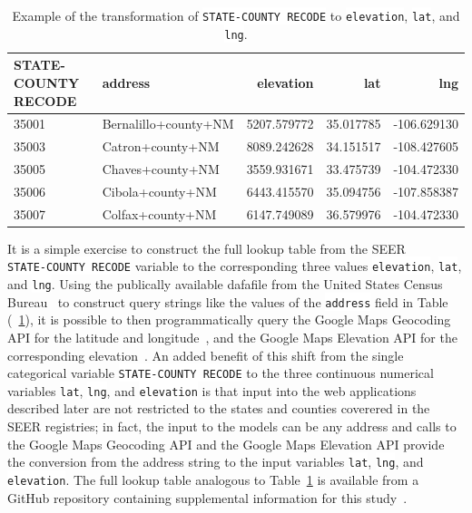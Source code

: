 \documentclass[a4paper,11pt]{article}
\newcommand{\codewhite}[1]{\colorbox{white}{\texttt{#1}}}
\begin{document}
\begin{table}[tbp]
\begin{center}
\begin{tabular}{llrrr}
\toprule
 STATE-COUNTY RECODE &               address &    elevation &        lat &         lng \\
\midrule
35001 &  Bernalillo+county+NM &  5207.579772 &  35.017785 & -106.629130 \\
35003 &      Catron+county+NM &  8089.242628 &  34.151517 & -108.427605 \\
35005 &      Chaves+county+NM &  3559.931671 &  33.475739 & -104.472330 \\
35006 &      Cibola+county+NM &  6443.415570 &  35.094756 & -107.858387 \\
35007 &      Colfax+county+NM &  6147.749089 &  36.579976 & -104.472330 \\
\bottomrule
\end{tabular}
\caption{\label{tab:nmhead} Example of the transformation of \codewhite{STATE-COUNTY RECODE} to \codewhite{elevation}, \codewhite{lat}, and \codewhite{lng}.}
\end{center}
\end{table}

It is a simple exercise to construct the full lookup table from the SEER \\  \codewhite{STATE-COUNTY RECODE} variable to the corresponding three values \codewhite{elevation}, \codewhite{lat}, and \codewhite{lng}. Using the publically available dafafile from the United States Census Bureau~\cite{census} to construct query strings like the values of the \codewhite{address} field in Table (~\ref{tab:nmhead}), it is possible to then programmatically query the Google Maps Geocoding API for the latitude and longitude~\cite{geocode}, and the Google Maps Elevation API for the corresponding elevation~\cite{elevation}.
An added benefit of this shift from the single categorical variable \codewhite{STATE-COUNTY RECODE} to the three continuous numerical variables \codewhite{lat}, \codewhite{lng}, and \codewhite{elevation} is that input into the web applications described later are not restricted to the states and counties coverered in the SEER registries; in fact, the input to the models can be any address and calls to the Google Maps Geocoding API and the Google Maps Elevation API provide the conversion from the address string to the input variables \codewhite{lat}, \codewhite{lng}, and \codewhite{elevation}. The full lookup table analogous to Table~\ref{tab:nmhead} is available from a GitHub repository containing supplemental information for this study~\cite{supp}.
\end{document}
